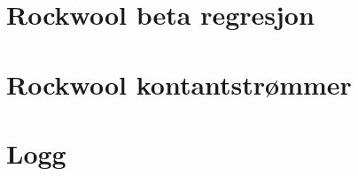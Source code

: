 \documentclass[12pt,a4paper]{report}
\begin{document}
\cleardoublepage
\renewcommand\appendixpagename{Appendiks}
\appendix
\appendixpage
\chapter{Rockwool beta regresjon}


\chapter{Rockwool kontantstrømmer}


\chapter{Logg}

\end{document}
